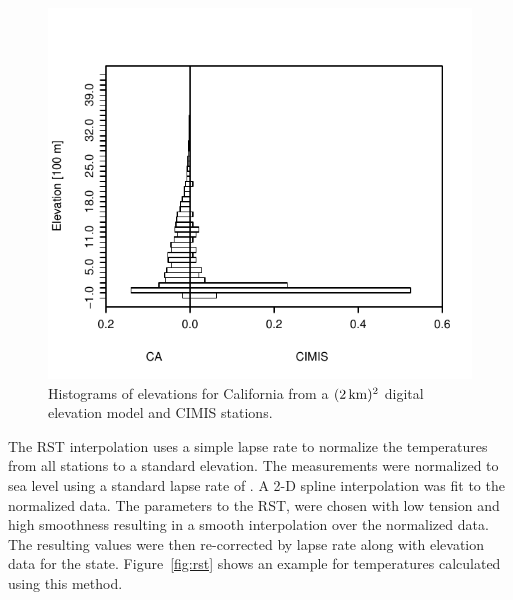 \documentclass[reviewcopy]{elsart}
\begin{document}
\begin{figure}
  \centering
  \includegraphics[width=.5\textwidth]{Z.pdf}
  \caption{Histograms of elevations for California from a
    $(\unit[2]{km})^2$ digital elevation model and \ac{CIMIS}
    stations.  }
\label{fig:elevation}
\end{figure}

The \ac{RST} interpolation uses a simple lapse rate to normalize the
temperatures from all stations to a standard elevation.  The
measurements were normalized to sea level using a standard lapse rate
of .  A 2-D spline interpolation
was fit to the normalized data.  The parameters to the \ac{RST}, were
chosen with low tension and high smoothness resulting in a smooth
interpolation over the normalized data.  The resulting values were
then re-corrected by lapse rate along with elevation data for the
state.  Figure~\ref{fig:rst} shows an example for temperatures
calculated using this method.
\end{document}
